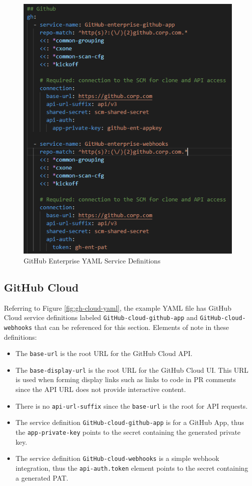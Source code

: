 \begin{figure}[h]
    \includegraphics[scale=1]{graphics/gh-ent-yaml.png}
    \centering
    \caption{GitHub Enterprise YAML Service Definitions}
    \label{fig:gh-ent-yaml}
\end{figure}


\subsection{GitHub Cloud}

Referring to Figure \ref{fig:gh-cloud-yaml}, the example YAML file has GitHub Cloud service definitions labeled
\texttt{GitHub-cloud-github-app} and \texttt{GitHub-cloud-webhooks} that can be referenced for this section.
Elements of note in these definitions:

\begin{itemize}
    \item The \texttt{base-url} is the root URL for the GitHub Cloud API.
    \item The \texttt{base-display-url} is the root URL for the GitHub Cloud UI. This URL is used
    when forming display links such as links to code in PR comments since the API URL does not
    provide interactive content.
    \item There is no \texttt{api-url-suffix} since the \texttt{base-url} is the root for API requests.
    \item The service definition \texttt{GitHub-cloud-github-app} is for a GitHub App, thus the \texttt{app-private-key} points to the secret
    containing the generated private key.
    \item The service definition \texttt{GitHub-cloud-webhooks} is a simple webhook integration, thus the \texttt{api-auth.token} element 
    points to the secret containing a generated PAT.
\end{itemize}


